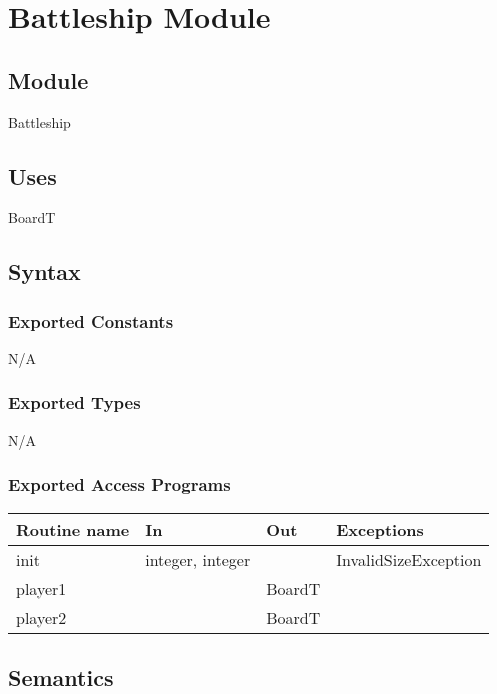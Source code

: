 \documentclass[12pt]{article}
\begin{document}
\newpage
\section {Battleship Module}

\subsection*{Module}

Battleship

\subsection* {Uses}

BoardT

\subsection* {Syntax}

\subsubsection* {Exported Constants}

N/A

\subsubsection* {Exported Types}

N/A

\subsubsection* {Exported Access Programs}

\begin{tabular}{| l | l | l | p{7cm} |}
\hline
\textbf{Routine name} & \textbf{In} & \textbf{Out} & \textbf{Exceptions}\\
\hline
init & integer, integer & ~ & InvalidSizeException\\
\hline
player1 & ~ & BoardT & ~\\
\hline
player2 & ~ & BoardT & ~\\
\hline

\end{tabular}

\subsection* {Semantics}
\end{document}
